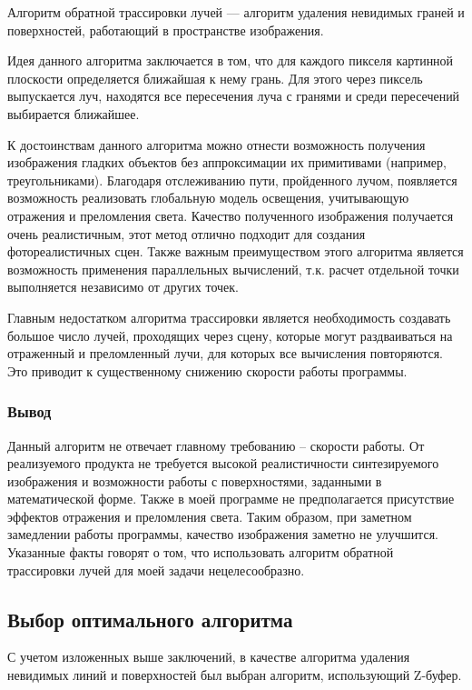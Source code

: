 Алгоритм обратной трассировки лучей \cite{rogers_alg} --- алгоритм удаления невидимых граней и поверхностей, работающий в пространстве изображения.

Идея данного алгоритма заключается в том, что для каждого пикселя картинной плоскости определяется ближайшая к нему грань. Для этого через пиксель выпускается луч, находятся все пересечения луча с гранями и среди пересечений выбирается ближайшее.

К достоинствам данного алгоритма можно отнести возможность получения изображения гладких объектов без аппроксимации их примитивами (например, треугольниками). Благодаря отслеживанию пути, пройденного лучом, появляется возможность реализовать глобальную модель освещения, учитывающую отражения и преломления света. Качество полученного изображения получается очень реалистичным, этот метод отлично подходит для создания фотореалистичных сцен. Также важным преимуществом этого алгоритма является возможность применения параллельных вычислений, т.к. расчет отдельной точки выполняется независимо от других точек.

Главным недостатком алгоритма трассировки является необходимость создавать большое число лучей, проходящих через сцену, которые могут раздваиваться на отраженный и преломленный лучи, для которых все вычисления повторяются. Это приводит к существенному снижению скорости работы программы.

\subsubsection*{Вывод}

Данный алгоритм не отвечает главному требованию – скорости работы. От реализуемого продукта не требуется высокой реалистичности синтезируемого изображения и возможности работы с поверхностями, заданными в математической форме. Также в моей программе не предполагается присутствие эффектов отражения и преломления света. Таким образом, при заметном замедлении работы программы, качество изображения заметно не улучшится. Указанные факты говорят о том, что использовать алгоритм обратной трассировки лучей для моей задачи нецелесообразно.

\subsection{Выбор оптимального алгоритма}
С учетом изложенных выше заключений, в качестве алгоритма удаления невидимых линий и поверхностей был выбран алгоритм, использующий Z-буфер.

